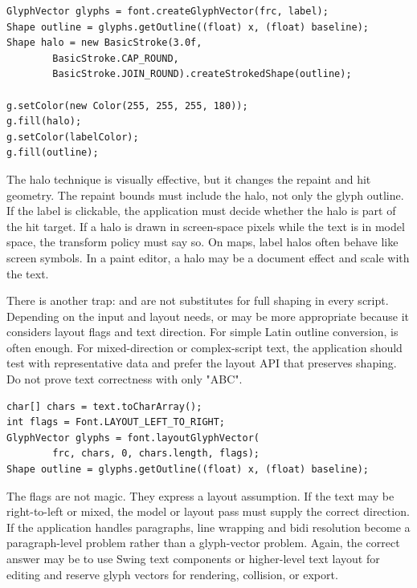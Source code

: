 \begin{lstlisting}[caption={Creating a text halo from glyph outline geometry.}]
GlyphVector glyphs = font.createGlyphVector(frc, label);
Shape outline = glyphs.getOutline((float) x, (float) baseline);
Shape halo = new BasicStroke(3.0f,
        BasicStroke.CAP_ROUND,
        BasicStroke.JOIN_ROUND).createStrokedShape(outline);

g.setColor(new Color(255, 255, 255, 180));
g.fill(halo);
g.setColor(labelColor);
g.fill(outline);
\end{lstlisting}

The halo technique is visually effective, but it changes the repaint and hit geometry. The repaint bounds must include the halo, not only the glyph outline. If the label is clickable, the application must decide whether the halo is part of the hit target. If a halo is drawn in screen-space pixels while the text is in model space, the transform policy must say so. On maps, label halos often behave like screen symbols. In a paint editor, a halo may be a document effect and scale with the text.

There is another trap:  and  are not substitutes for full shaping in every script. Depending on the input and layout needs,  or  may be more appropriate because it considers layout flags and text direction. For simple Latin outline conversion,  is often enough. For mixed-direction or complex-script text, the application should test with representative data and prefer the layout API that preserves shaping. Do not prove text correctness with only "ABC".

\begin{lstlisting}[caption={Using layoutGlyphVector when direction and shaping matter.}]
char[] chars = text.toCharArray();
int flags = Font.LAYOUT_LEFT_TO_RIGHT;
GlyphVector glyphs = font.layoutGlyphVector(
        frc, chars, 0, chars.length, flags);
Shape outline = glyphs.getOutline((float) x, (float) baseline);
\end{lstlisting}

The flags are not magic. They express a layout assumption. If the text may be right-to-left or mixed, the model or layout pass must supply the correct direction. If the application handles paragraphs, line wrapping and bidi resolution become a paragraph-level problem rather than a glyph-vector problem. Again, the correct answer may be to use Swing text components or higher-level text layout for editing and reserve glyph vectors for rendering, collision, or export.

